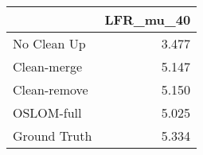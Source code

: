 \begin{tabular}{lr}
\toprule
{} & LFR_mu_40 \\
\midrule
No Clean Up  &     3.477 \\
Clean-merge  &     5.147 \\
Clean-remove &     5.150 \\
OSLOM-full   &     5.025 \\
Ground Truth &     5.334 \\
\bottomrule
\end{tabular}
